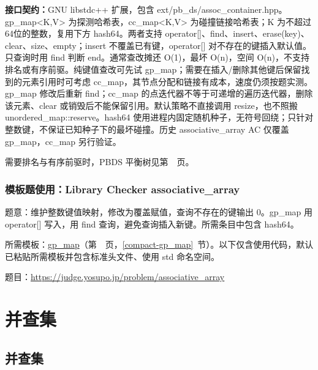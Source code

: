{\sloppy{}\noindent\textbf{接口契约：}GNU libstdc++ 扩展，包含 ext/pb\_ds/assoc\_container.hpp。gp\_map<K,V> 为探测哈希表，cc\_map<K,V> 为碰撞链接哈希表；K 为不超过64位的整数，复用下方 hash64。两者支持 operator[]、find、insert、erase(key)、clear、size、empty；insert 不覆盖已有键，operator[] 对不存在的键插入默认值。只查询时用 find 判断 end。通常查改摊还 O(1)，最坏 O(n)，空间 O(n)，不支持排名或有序前驱。纯键值查改可先试 gp\_map；需要在插入/删除其他键后保留找到的元素引用时可考虑 cc\_map，其节点分配和链接有成本，速度仍须按题实测。gp\_map 修改后重新 find；cc\_map 的点迭代器不等于可递增的遍历迭代器，删除该元素、clear 或销毁后不能保留引用。默认策略不直接调用 resize，也不照搬 unordered\_map::reserve。hash64 使用进程内固定随机种子，无符号回绕；只针对整数键，不保证已知种子下的最坏碰撞。历史 associative\_array AC 仅覆盖 gp\_map，cc\_map 另行验证。\par}

需要排名与有序前驱时，PBDS 平衡树见第~\pageref{compact-ost}~页。



\Needspace{433pt}

\subsection*{模板题使用：Library Checker associative\_array}

\label{usage-example-68}

题意：维护整数键值映射，修改为覆盖赋值，查询不存在的键输出 0。gp\_map 用 operator[] 写入，用 find 查询，避免查询插入新键。所需条目中包含 hash64。

所需模板：\hyperref[compact-gp_map]{gp\_\allowbreak{}map}（第~\pageref{compact-gp_map}~页，\ref{compact-gp_map}~节）。以下仅含使用代码，默认已粘贴所需模板并包含标准头文件、使用 std 命名空间。

题目：\url{https://judge.yosupo.jp/problem/associative_array}



\Needspace{622pt}

\chapter{并查集}

\section{并查集}

